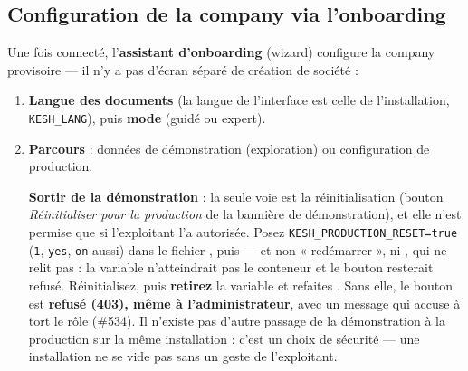 \documentclass[a4paper,11pt,oneside]{article}
\begin{document}
\subsection{Configuration de la company via l'onboarding}\label{sec:onboarding-config}

Une fois connecté, l'\textbf{assistant d'onboarding} (wizard) configure la company provisoire — il n'y a pas d'écran séparé de création de société :

\begin{enumerate}
    \item \textbf{Langue des documents} (la langue de l'interface est celle de l'installation, \texttt{KESH\_LANG}), puis \textbf{mode} (guidé ou expert).
    \item \textbf{Parcours} : données de démonstration (exploration) ou configuration de production.

    \textbf{Sortir de la démonstration} : la seule voie est la réinitialisation (bouton \emph{Réinitialiser pour la production} de la bannière de démonstration), et elle n'est permise que si l'exploitant l'a autorisée. Posez \texttt{KESH\_PRODUCTION\_RESET=true} (\texttt{1}, \texttt{yes}, \texttt{on} aussi) dans le fichier , puis  --- et non « redémarrer », ni , qui ne relit pas  : la variable n'atteindrait pas le conteneur et le bouton resterait refusé. Réinitialisez, puis \textbf{retirez} la variable et refaites . Sans elle, le bouton est \textbf{refusé (403), même à l'administrateur}, avec un message qui accuse à tort le rôle (\#534). Il n'existe pas d'autre passage de la démonstration à la production sur la même installation : c'est un choix de sécurité --- une installation ne se vide pas sans un geste de l'exploitant.


\end{enumerate}
\end{document}
